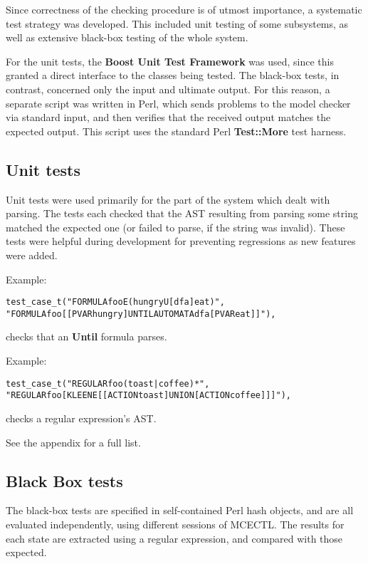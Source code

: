 \documentclass[11pt]{article}
\theoremstyle{definition}
\begin{document}
Since correctness of the checking procedure is of utmost importance, a
systematic test strategy was developed. This included unit testing of some
subsystems, as well as extensive black-box testing of the whole system.

For the unit tests, the \textbf{Boost Unit Test Framework} was used, since this
granted a direct interface to the classes being tested. The black-box tests, in
contrast, concerned only the input and ultimate output. For this reason, a
separate script was written in Perl, which sends problems to the model checker
via standard input, and then verifies that the received output matches the
expected output. This script uses the standard Perl \textbf{Test::More} test
harness.

\subsection{Unit tests}

Unit tests were used primarily for the part of the system which dealt with
parsing. The tests each checked that the AST resulting from parsing some string
matched the expected one (or failed to parse, if the string was invalid). These
tests were helpful during development for preventing regressions as new
features were added.

Example:
\begin{alltt}
test_case_t("FORMULA foo { E(hungry U[dfa] eat) }",
         "FORMULA foo { [[PVAR hungry] UNTIL {AUTOMATA dfa} [PVAR eat]] }"),
\end{alltt}
checks that an \textbf{Until} formula parses.

Example:
\begin{alltt}
test_case_t("REGULAR foo { (toast|coffee)* }",
         "REGULAR foo { [KLEENE [[ACTION toast] UNION [ACTION coffee]]] }"),
\end{alltt}
checks a regular expression's AST.

See the appendix for a full list.

\subsection{Black Box tests}

The black-box tests are specified in self-contained Perl hash objects, and are
all evaluated independently, using different sessions of MCECTL. The results
for each state are extracted using a regular expression, and compared with
those expected.
\end{document}
